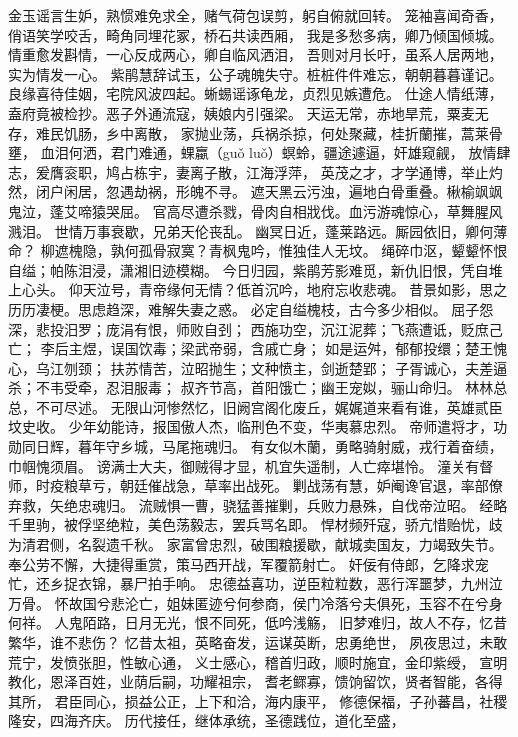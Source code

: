 \documentclass[12pt,oneside]{book}
\begin{document}
金玉谣言生妒，熟惯难免求全，赌气荷包误剪，躬自俯就回转。
笼袖喜闻奇香，俏语笑学咬舌，畸角同埋花冢，桥石共读西厢，
我是多愁多病，卿乃倾国倾城。
情重愈发斟情，一心反成两心，卿自临风洒泪，
吾则对月长吁，虽系人居两地，实为情发一心。
紫鹃慧辞试玉，公子魂魄失守。桩桩件件难忘，朝朝暮暮谨记。
良缘喜待佳姻，宅院风波四起。蜥蜴谣诼龟龙，贞烈见嫉遭危。
仕途人情纸薄，盍府竟被检抄。恶子外通流寇，姨娘内引强梁。
天运无常，赤地旱荒，粟麦无存，难民饥肠，乡中离散，
家抛业荡，兵祸杀掠，何处聚藏，桂折蘭摧，蒿莱骨壅，
血泪何洒，君门难通，蜾蠃（guǒ luǒ）螟蛉，疆途遽逼，奸雄窥觎，
放情肆志，爰膺衮职，鸠占栋宇，妻离子散，江海浮萍，
英茂之才，才学通博，举止灼然，闭户闲居，忽遇劫祸，形魄不寻。
遮天黑云污浊，遍地白骨重叠。楸榆飒飒鬼泣，蓬艾啼猿哭屈。
官高尽遭杀戮，骨肉自相戕伐。血污游魂惊心，草舞腥风溅泪。
世情万事衰歇，兄弟天伦丧乱。
幽冥日近，蓬莱路远。厮园依旧，卿何薄命？
柳遮槐隐，孰何孤骨寂寞？青枫鬼吟，惟独佳人无坟。
绳碎巾沤，颦颦怀恨自缢；帕陈泪浸，潇湘旧迹模糊。
今日归园，紫鹃芳影难觅，新仇旧恨，凭自堆上心头。
仰天泣号，青帝缘何无情？低首沉吟，地府忘收悲魂。
昔景如影，思之历历凄梗。思虑趋深，难解失妻之惑。
必定自缢槐枝，古今多少相似。
屈子怨深，悲投汨罗；庞涓有恨，师败自刭；
西施功空，沉江泥葬；飞燕遭诋，贬庶己亡；
李后主煜，误国饮毒；梁武帝弱，含戚亡身；
如是运舛，郁郁投缳；楚王愧心，乌江刎颈；
扶苏情苦，泣昭抛生；文种愤主，剑逝楚郢；
子胥诚心，夫差逼杀；不韦受牵，忍泪服毒；
叔齐节高，首阳饿亡；幽王宠姒，骊山命归。
林林总总，不可尽述。
无限山河惨然忆，旧阙宫阁化废丘，娓娓道来看有谁，英雄贰臣坟史收。
少年幼能诗，报国傲人杰，临刑色不变，华夷慕忠烈。
帝师遣将才，功勋同日辉，暮年守乡城，马尾拖魂归。
有女似木蘭，勇略骑射威，戎行着奋绩，巾帼愧须眉。
谤满士大夫，御贼得才显，机宜失遥制，人亡瘁堪怜。
潼关有督师，时疫粮草亏，朝廷催战急，草率出战死。
剿战荡有慧，妒阉谗官退，率部僚弃救，矢绝忠魂归。
流贼惧一曹，骁猛善摧剿，兵败力悬殊，自伐帝泣昭。
经略千里驹，被俘坚绝粒，美色荡毅志，罢兵骂名即。
悍材频歼寇，骄亢惜贻忧，歧为清君侧，名裂遗千秋。
家富曾忠烈，破围粮援歇，献城卖国友，力竭致失节。
奉公劳不懈，大捷得重赏，策马西开战，军覆箭射亡。
奸佞有侍郎，乞降求宠忙，还乡捉衣锦，暴尸拍手响。
忠德益喜功，逆臣粒粒数，恶行浑噩梦，九州泣万骨。
怀故国兮悲沦亡，姐妹匿迹兮何参商，侯门冷落兮夫俱死，玉容不在兮身何祥。
人鬼陌路，日月无光，恨不同死，低吟浅觞，
旧梦难归，故人不存，忆昔繁华，谁不悲伤？
忆昔太祖，英略奋发，运谋英断，忠勇绝世，
夙夜思过，未敢荒宁，发愤张胆，性敏心通，
义士感心，稽首归政，顺时施宜，金印紫绶，
宣明教化，恩泽百姓，业荫后嗣，功耀祖宗，
耆老鳏寡，馈饷留饮，贤者智能，各得其所，
君臣同心，损益公正，上下和洽，海内康平，
修德保福，子孙蕃昌，社稷隆安，四海齐庆。
历代接任，继体承统，圣德践位，道化至盛，
\end{document}
